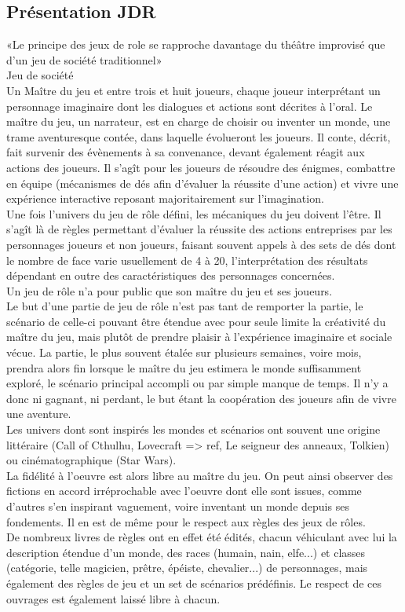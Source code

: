 \documentclass[a4paper,12pt,final,oneside]{article}
\begin{document}
\subsection{Présentation JDR}
«Le principe des jeux de role se rapproche davantage du théâtre improvisé que d'un jeu de société traditionnel» \cite{cristofari2010lecteur}\\
Jeu de société\\
Un Maître du jeu et entre trois et huit joueurs, chaque joueur interprétant un personnage imaginaire dont les dialogues et actions sont décrites à l'oral. Le maître du jeu, un narrateur, est en charge de choisir ou inventer un monde, une trame aventuresque contée, dans laquelle évolueront les joueurs. Il conte, décrit, fait survenir des évènements à sa convenance, devant également réagit aux actions des joueurs. Il s'agît pour les joueurs de résoudre des énigmes, combattre en équipe (mécanismes de dés afin d'évaluer la réussite d'une action) et vivre une expérience interactive reposant majoritairement sur l'imagination.\\
Une fois l'univers du jeu de rôle défini, les mécaniques du jeu doivent l'être. Il s'agît là de règles permettant d'évaluer la réussite des actions entreprises par les personnages joueurs et non joueurs, faisant souvent appels à des sets de dés dont le nombre de face varie usuellement de 4 à 20, l'interprétation des résultats dépendant en outre des caractéristiques des personnages concernées.\\
Un jeu de rôle n'a pour public que son maître du jeu et ses joueurs.\\
Le but d'une partie de jeu de rôle n'est pas tant de remporter la partie, le scénario de celle-ci pouvant être étendue avec pour seule limite la créativité du maître du jeu, mais plutôt de prendre plaisir à l'expérience imaginaire et sociale vécue. La partie, le plus souvent étalée sur plusieurs semaines, voire mois, prendra alors fin lorsque le maître du jeu estimera le monde suffisamment exploré, le scénario principal accompli ou par simple manque de temps. Il n'y a donc ni gagnant, ni perdant, le but étant la coopération des joueurs afin de vivre une aventure.\\

Les univers dont sont inspirés les mondes et scénarios ont souvent une origine littéraire (Call of Cthulhu, Lovecraft => ref, Le seigneur des anneaux, Tolkien) ou cinématographique (Star Wars).\\
La fidélité à l'oeuvre est alors libre au maître du jeu. On peut ainsi observer des fictions en accord irréprochable avec l'oeuvre dont elle sont issues, comme d'autres s'en inspirant vaguement, voire inventant un monde depuis ses fondements. Il en est de même pour le respect aux règles des jeux de rôles.\\
De nombreux livres de règles ont en effet été édités, chacun véhiculant avec lui la description étendue d'un monde, des races (humain, nain, elfe...) et classes (catégorie, telle magicien, prêtre, épéiste, chevalier...) de personnages, mais également des règles de jeu et un set de scénarios prédéfinis. Le respect de ces ouvrages est également laissé libre à chacun.\\
\end{document}
